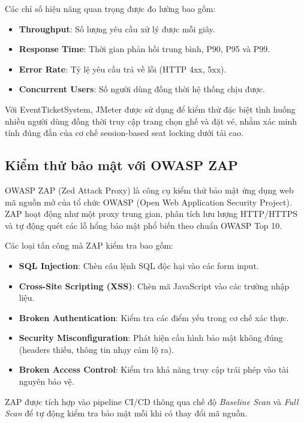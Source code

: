 \documentclass[../main.tex]{subfiles}
\begin{document}
Các chỉ số hiệu năng quan trọng được đo lường bao gồm:

\begin{itemize}
    \item \textbf{Throughput}: Số lượng yêu cầu xử lý được mỗi giây.
    \item \textbf{Response Time}: Thời gian phản hồi trung bình, P90, P95 và P99.
    \item \textbf{Error Rate}: Tỷ lệ yêu cầu trả về lỗi (HTTP 4xx, 5xx).
    \item \textbf{Concurrent Users}: Số người dùng đồng thời hệ thống chịu được.
\end{itemize}

Với EventTicketSystem, JMeter được sử dụng để kiểm thử đặc biệt tình huống nhiều người dùng đồng thời truy cập trang chọn ghế và đặt vé, nhằm xác minh tính đúng đắn của cơ chế session-based seat locking dưới tải cao.

\subsection{Kiểm thử bảo mật với OWASP ZAP}

OWASP ZAP (Zed Attack Proxy) là công cụ kiểm thử bảo mật ứng dụng web mã nguồn mở của tổ chức OWASP (Open Web Application Security Project). ZAP hoạt động như một proxy trung gian, phân tích lưu lượng HTTP/HTTPS và tự động quét các lỗ hổng bảo mật phổ biến theo chuẩn OWASP Top 10.

Các loại tấn công mà ZAP kiểm tra bao gồm:

\begin{itemize}
    \item \textbf{SQL Injection}: Chèn câu lệnh SQL độc hại vào các form input.
    \item \textbf{Cross-Site Scripting (XSS)}: Chèn mã JavaScript vào các trường nhập liệu.
    \item \textbf{Broken Authentication}: Kiểm tra các điểm yếu trong cơ chế xác thực.
    \item \textbf{Security Misconfiguration}: Phát hiện cấu hình bảo mật không đúng (headers thiếu, thông tin nhạy cảm lộ ra).
    \item \textbf{Broken Access Control}: Kiểm tra khả năng truy cập trái phép vào tài nguyên bảo vệ.
\end{itemize}

ZAP được tích hợp vào pipeline CI/CD thông qua chế độ \textit{Baseline Scan} và \textit{Full Scan} để tự động kiểm tra bảo mật mỗi khi có thay đổi mã nguồn.
\end{document}
